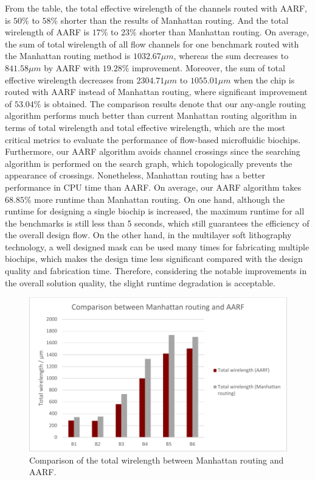 \documentclass[journal]{IEEEtran}
\begin{document}
From the table, the total effective wirelength of the channels routed with AARF, is $50\%$ to $58\%$ shorter than the results of Manhattan routing. 
And the total wirelength of AARF is $17\%$ to $23\%$ shorter than Manhattan routing. On average, the sum of total wirelength of all flow channels for one benchmark routed with the Manhattan routing method is $1032.67 {\mu}m$, whereas the sum decreases to $841.58 {\mu}m$ by AARF with $19.28\%$ improvement.
Moreover, the sum of total effective wirelength decreases from $2304.71 {\mu}m$ to $1055.01 {\mu}m$ when the chip is routed with AARF instead of Manhattan routing, where significant improvement of $53.04\%$ is obtained.
The comparison results denote that our any-angle routing algorithm performs much better than current Manhattan routing algorithm in terms of total wirelength and total effective wirelength, which are the most critical metrics to evaluate the performance of flow-based microfluidic biochips. 
Furthermore, our AARF algorithm avoids channel crossings since the searching algorithm is performed on the search graph, which topologically prevents the appearance of crossings. 
Nonetheless, Manhattan routing has a better performance in CPU time than AARF. On average, our AARF algorithm takes $68.85\%$ more runtime than Manhattan routing. On one hand, although the runtime for designing a single biochip is increased, the maximum runtime for all the benchmarks is still less than 5 seconds, which still guarantees the efficiency of the overall design flow. On the other hand, in the multilayer soft lithography technology, a well designed mask can be used many times for fabricating multiple biochips, which makes the design time less significant compared with the design quality and fabrication time. Therefore, considering the notable improvements in the overall solution quality, the slight runtime degradation is acceptable. 

\begin{figure}
	\label{fig:mvaa}
	\centering
	\includegraphics[width=0.95\columnwidth, angle=0]{./Figs/MR_vs_AARF_A.pdf}
	\vspace{-0.2cm}
	\caption{Comparison of the total wirelength between Manhattan routing and AARF.}
	\label{fig:mvaa}
\end{figure}
\end{document}
